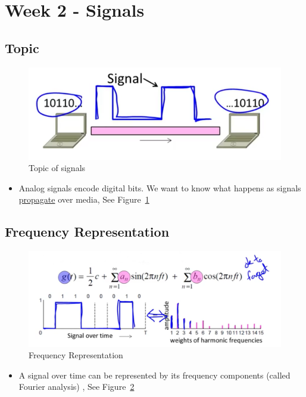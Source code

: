 \documentclass[12pt]{ctexart}   %
\begin{document}
\section{Week 2 - Signals}
	\subsection{Topic}
	
	 \begin{figure}[h!] %
	 \centering
	 \includegraphics[scale=0.7]{images/2-3-1}
	\caption{ Topic of signals}
	 \label{fig:2-3-1}
	 \end{figure}
	 
	\begin{itemize}
		\item Analog signals encode digital bits. We want to know what happens as signals \underline{propagate} over media, See Figure~\ref{fig:2-3-1}
	\end{itemize}
	
	\subsection{Frequency Representation}
	
	 \begin{figure}[h!] %
	 \centering
	 \includegraphics[scale=0.7]{images/2-3-2}
	\caption{ Frequency Representation}
	 \label{fig:2-3-2}
	 \end{figure}
	 
	\begin{itemize}
		\item A signal over time can be represented by its frequency components (called Fourier analysis) , See Figure~\ref{fig:2-3-2}
	\end{itemize}
	
\end{document}
